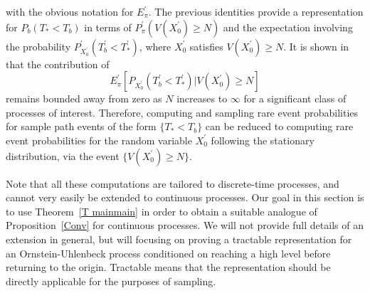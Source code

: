 with the obvious notation for $E_{\pi }^{\prime }$. The previous identities
provide a representation for $P_{b}(T_{\ast }<T_{b})$ in terms of $P_{\pi
}^{\prime }\left( V\left( X_{0}^{\prime }\right) \geq N\right) $ and the
expectation involving the probability $P_{X_{0}^{\prime }}^{\prime
}(T_{b}^{\prime }<T_{\ast }^{\prime })$, where $X_{0}^{\prime }$ satisfies $%
V\left( X_{0}^{\prime }\right) \geq N$. It is shown in \citet{Blanchet2013}
that the contribution of
\begin{equation*}
E_{\pi }^{\prime }[P_{X_{0}^{\prime }}(T_{b}^{\prime }<T_{\ast }^{\prime
})|V\left( X_{0}^{\prime }\right) \geq N]
\end{equation*}%
remains bounded away from zero as $N$ increases to $\infty $ for a
significant class of processes of interest. Therefore, computing and
sampling rare event probabilities for sample path events of the form $%
\{T_{\ast }<T_{b}\}$ can be reduced to computing rare event probabilities
for the random variable $X_{0}^{\prime }$ following the stationary
distribution, via the event $\{V\left( X_{0}^{\prime }\right) \geq N\}$.

Note that all these computations are tailored to discrete-time processes,
and cannot very easily be extended to continuous processes. Our goal in this
section is to use Theorem~\ref{T mainmain} in order to obtain a suitable
analogue of Proposition~\ref{Conv} for continuous processes. We will not
provide full details of an extension in general, but will focusing on
proving a tractable representation for an Ornstein-Uhlenbeck process
conditioned on reaching a high level before returning to the origin.
Tractable means that the representation should be directly applicable for
the purposes of sampling.

